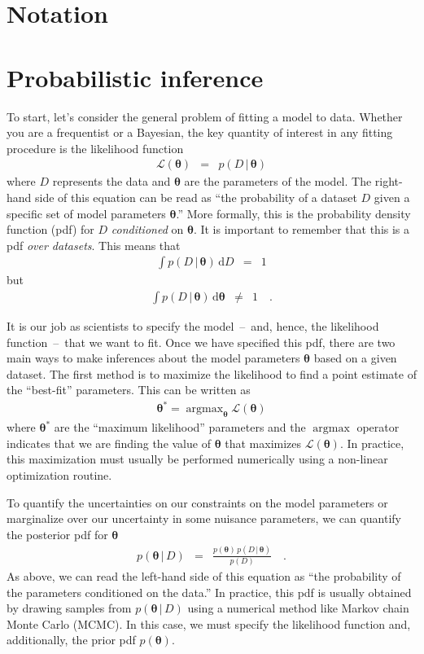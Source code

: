 \documentclass[modern, letterpaper]{aastex61}
\newcommand{\dd}{\ensuremath{\,\mathrm{d}}}
\newcommand{\bvec}[1]{{\ensuremath{\boldsymbol{#1}}}}
\DeclareMathOperator*{\argmax}{argmax}
\begin{document}
\section{Notation}

\section{Probabilistic inference}

To start, let's consider the general problem of fitting a model to data.
Whether you are a frequentist or a Bayesian, the key quantity of interest in
any fitting procedure is the likelihood function
\begin{eqnarray}
\mathcal{L}(\bvec{\theta}) &=& p(D\,|\,\bvec{\theta})
\end{eqnarray}
where $D$ represents the data and $\bvec{\theta}$ are the parameters of the
model.
The right-hand side of this equation can be read as ``the probability of a
dataset $D$ given a specific set of model parameters $\bvec{\theta}$.''
More formally, this is the probability density function (pdf) for $D$
\emph{conditioned} on $\bvec{\theta}$.
It is important to remember that this is a pdf \emph{over datasets}.
This means that
\begin{eqnarray}
\int p(D\,|\,\bvec{\theta}) \dd D &=& 1
\end{eqnarray}
but
\begin{eqnarray}
    \int p(D\,|\,\bvec{\theta}) \dd \bvec{\theta} &\ne& 1 \quad.
\end{eqnarray}

It is our job as scientists to specify the model~--~and, hence, the likelihood
function~--~that we want to fit.
Once we have specified this pdf, there are two main ways to make inferences
about the model parameters $\bvec{\theta}$ based on a given dataset.
The first method is to maximize the likelihood to find a point estimate of the
``best-fit'' parameters.
This can be written as
\begin{eqnarray}
\bvec{\theta}^* = \argmax_{\bvec{\theta}} \mathcal{L}(\bvec{\theta})
\end{eqnarray}
where $\bvec{\theta}^*$ are the ``maximum likelihood'' parameters and the
$\argmax$ operator indicates that we are finding the value of $\bvec{\theta}$
that maximizes $\mathcal{L}(\bvec{\theta})$.
In practice, this maximization must usually be performed numerically using a
non-linear optimization routine.

To quantify the uncertainties on our constraints on the model parameters or
marginalize over our uncertainty in some nuisance parameters, we can quantify
the posterior pdf for $\bvec{\theta}$
\begin{eqnarray}
p(\bvec{\theta}\,|\,D) &=&
    \frac{p(\bvec{\theta})\,p(D\,|\,\bvec{\theta})}{p(D)} \quad.
\end{eqnarray}
As above, we can read the left-hand side of this equation as ``the probability
of the parameters conditioned on the data.''
In practice, this pdf is usually obtained by drawing samples from
$p(\bvec{\theta}\,|\,D)$ using a numerical method like Markov chain Monte
Carlo (MCMC).
In this case, we must specify the likelihood function and, additionally, the
prior pdf $p(\bvec{\theta})$.
\end{document}
